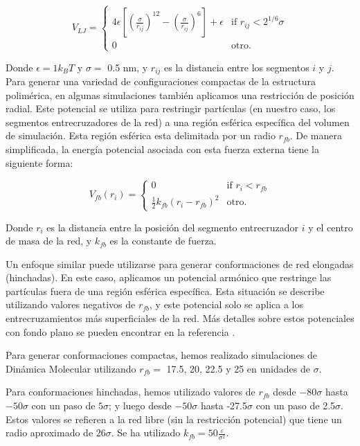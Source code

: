 \begin{equation}
	V_{LJ}=\begin{cases}
		4\epsilon \left[\left(\frac{\sigma}{r_{ij}}\right)^{12} - \left(\frac{\sigma}{r_{ij}}\right)^{6}\right] + \epsilon & \text{if $r_{ij} < 2^{1/6}\sigma$}\\
		0 & \text{otro}.
	\end{cases}
\end{equation}



Donde $\epsilon = 1 k_BT$ y $\sigma = $ 0.5 nm, y $r_{ij}$ es la distancia entre los segmentos $i$ y $j$.
Para generar una variedad de configuraciones compactas de la estructura polim\'erica, en algunas simulaciones tambi\'en aplicamos una restricci\'on de posici\'on radial.
Este potencial se utiliza para restringir part\'iculas (en nuestro caso, los segmentos entrecruzadores de la red) a una regi\'on esf\'erica espec\'ifica del volumen de simulaci\'on.
Esta regi\'on esf\'erica esta delimitada por un radio $r_{fb}$.
De manera simplificada, la energ\'ia potencial asociada con esta fuerza externa tiene la siguiente forma:

\begin{equation}
	V_{fb}(r_i)=\begin{cases}
		0 & \text{if $r_{i} < r_{fb}$}\\
		\frac{1}{2}k_{fb}\left(r_i -r_{fb}\right)^2 & \text{otro}.
	\end{cases}
\end{equation}


Donde $r_i$ es la distancia entre la posici\'on del segmento entrecruzador $i$ y el centro de masa de la red, y $k_{fb}$ es la constante de fuerza.

Un enfoque similar puede utilizarse para generar conformaciones de red elongadas (hinchadas). En este caso, aplicamos un potencial arm\'onico que restringe las part\'iculas fuera de una regi\'on esférica espec\'ifica. Esta situaci\'on se describe utilizando valores negativos de $r_{fb}$, y este potencial solo se aplica a los entrecruzamientos m\'as superficiales de la red. M\'as detalles sobre estos potenciales con fondo plano se pueden encontrar en la referencia \cite{GROMACSRestraints}.

Para generar conformaciones compactas, hemos realizado simulaciones de Din\'amica Molecular utilizando $r_{fb} =$ 17.5, 20, 22.5 y 25 en unidades de $\sigma$.

Para conformaciones hinchadas, hemos utilizado valores de $r_{fb}$ desde $-80\sigma$ hasta $-50\sigma$ con un paso de $5\sigma$; y luego desde $-50\sigma$ hasta -27.5$\sigma$ con un paso de 2.5$\sigma$. Estos valores se refieren a la red libre (sin la restricci\'on potencial) que tiene un radio aproximado de $26\sigma$.
Se ha utilizado $k_{fb} = 50\frac{\varepsilon}{\sigma^2} $.



